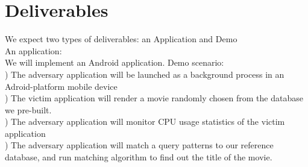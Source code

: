 \section{Deliverables}
\label{sec:deliverables}
We expect two types of deliverables: an Application and Demo\\
An application: \\
We will implement an Android application.
Demo scenario: \\
) The adversary application will be launched as a background process in an Adroid-platform mobile device\\
) The victim application will render a movie randomly chosen from the database we pre-built. \\
) The adversary application will monitor CPU usage statistics of the victim application\\
) The adversary application will match a query patterns to our reference database, and run matching algorithm to find out the title of the movie.\\



